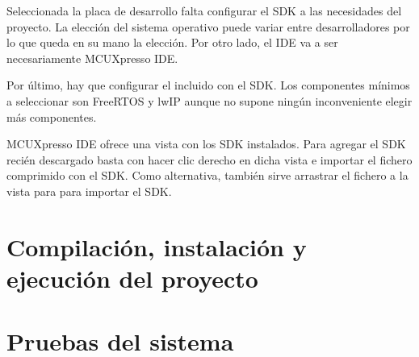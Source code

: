 
Seleccionada la placa de desarrollo falta configurar el SDK a las necesidades
del proyecto. La elección del sistema operativo puede variar entre
desarrolladores por lo que queda en su mano la elección. Por otro lado, el IDE
va a ser necesariamente MCUXpresso IDE.

Por último, hay que configurar el  incluido con el SDK.
Los componentes mínimos a seleccionar son FreeRTOS y lwIP aunque no supone
ningún inconveniente elegir más componentes.


MCUXpresso IDE ofrece una vista con los SDK instalados. Para agregar el SDK
recién descargado basta con hacer clic derecho en dicha vista e importar el
fichero comprimido con el SDK. Como alternativa, también sirve arrastrar el
fichero a la vista para para importar el SDK.












\cleardoublepage
\section{Compilación, instalación y ejecución del proyecto}

\section{Pruebas del sistema}
